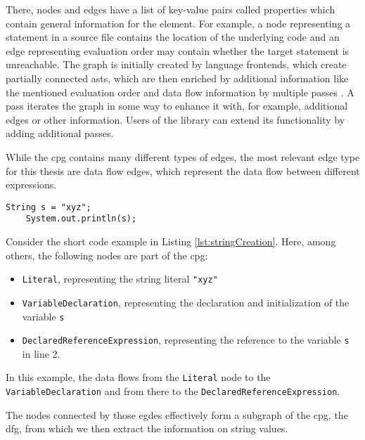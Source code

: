 There, nodes and edges have a list of key-value pairs called properties which contain general information for the element. For example, a node representing a statement in a source file contains the location of the underlying code and an edge representing evaluation order may contain whether the target statement is unreachable. The graph is initially created by language frontends, which create partially connected \acp{ast}, which are then enriched by additional information like the mentioned evaluation order and data flow information by multiple passes \cite{cpg}. A pass iterates the graph in some way to enhance it with, for example, additional edges or other information.
Users of the library can extend its functionality by adding additional passes.

While the \ac{cpg} contains many different types of edges, the most relevant edge type for this thesis are data flow edges, which represent the data flow between different expressions.

\begin{lstlisting}[label={lst:stringCreation}, caption={Example code}, captionpos=b, numbers=right]
	String s = "xyz";
	System.out.println(s);
\end{lstlisting}

Consider the short code example in Listing \ref{lst:stringCreation}. Here, among others, the following nodes are part of the \ac{cpg}:

\begin{itemize}
	\item \lstinline|Literal|, representing the string literal \lstinline{"xyz"}
	\item \lstinline|VariableDeclaration|, representing the declaration and initialization of the variable \lstinline|s|
	\item \lstinline|DeclaredReferenceExpression|, representing the reference to the variable \lstinline|s| in line 2.
\end{itemize}

In this example, the data flows from the \lstinline|Literal| node to the \lstinline|VariableDeclaration| and from there to the \lstinline|DeclaredReferenceExpression|.

The nodes connected by those egdes effectively form a subgraph of the \ac{cpg}, the \ac{dfg}, from which we then extract the information on string values.



